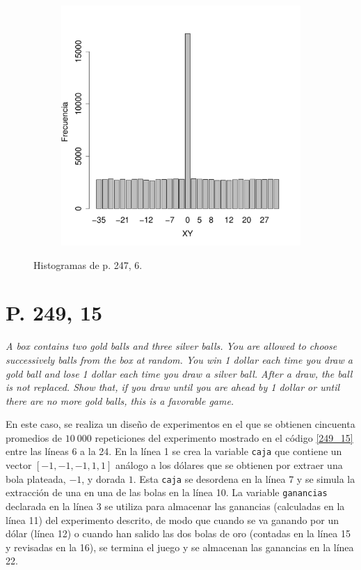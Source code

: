 \documentclass[paper=leter, fontsize=11pt]{scrartcl}
\begin{document}
\begin{figure}
\begin{subfigure}{0.5\textwidth}
        \label{247_6_Y}
    \end{subfigure}
    \begin{subfigure}{1\textwidth}
        \centering
        \includegraphics[scale=0.4]{247_6_XY.pdf}
        \label{247_6_XY}
    \end{subfigure}
    \caption{Histogramas de p. 247, 6.}
    \label{247_6_Fig}
\end{figure}

\section*{P. 249, 15}
\emph{A box contains two gold balls and three silver balls. You are allowed to choose successively balls from the box at random. You win 1 dollar each time you draw a gold ball and lose 1 dollar each time you draw a silver ball. After a draw, the ball is not replaced. Show that, if you draw until you are ahead by 1 dollar or until there are no more gold balls, this is a favorable game.}

En este caso, se realiza un diseño de experimentos en el que se obtienen cincuenta promedios de $10\ 000$ repeticiones del experimento mostrado en el código \ref{249_15} entre las líneas 6 a la 24. En la línea 1 se crea la variable \texttt{caja} que contiene un vector $[-1, -1, -1, 1, 1]$ análogo a los dólares que se obtienen por extraer una bola plateada, $-1$, y dorada $1$. Esta \texttt{caja} se desordena en la línea 7 y se simula la extracción de una en una de las bolas en la línea 10. La variable \texttt{ganancias} declarada en la línea 3 se utiliza para almacenar las ganancias (calculadas en la línea 11) del experimento descrito, de modo que cuando se va ganando por un dólar (línea 12) o cuando han salido las dos bolas de oro (contadas en la línea 15 y revisadas en la 16), se termina el juego y se almacenan las ganancias en la línea 22.
\end{document}
